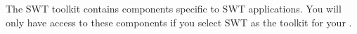 
The SWT toolkit contains components specific to SWT applications. You will only have access to these components if you select SWT as the toolkit for your \gdaut{}. 

